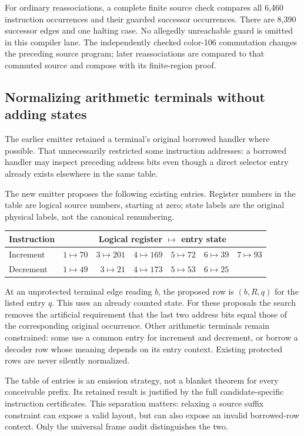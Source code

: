 For ordinary reassociations, a complete finite source check compares all
6,460 instruction occurrences and their guarded successor occurrences.
There are 8,390 successor edges and one halting case.  No allegedly
unreachable guard is omitted in this compiler lane.  The independently
checked color-106 commutation changes the preceding source program; later
reassociations are compared to that commuted source and compose with its
finite-region proof.

\subsection{Normalizing arithmetic terminals without adding states}

The earlier emitter retained a terminal's original borrowed handler where
possible.  That unnecessarily restricted some instruction addresses: a
borrowed handler may inspect preceding address bits even though a direct
selector entry already exists elsewhere in the same table.

The new emitter proposes the following existing entries.  Register numbers
in the table are logical source numbers, starting at zero; state labels
are the original physical labels, not the canonical renumbering.

\begin{center}
\begin{tabular}{@{}lrrrrrr@{}}
\toprule
Instruction & \multicolumn{6}{c}{Logical register $\longmapsto$ entry state}\\
\midrule
Increment & $1\mapsto70$ & $3\mapsto201$ & $4\mapsto169$
 & $5\mapsto72$ & $6\mapsto39$ & $7\mapsto93$\\
Decrement & $1\mapsto49$ & $3\mapsto21$ & $4\mapsto173$
 & $5\mapsto53$ & $6\mapsto25$ & \\
\bottomrule
\end{tabular}
\end{center}

At an unprotected terminal edge reading $b$, the proposed row is
$(b,R,q)$ for the listed entry $q$.  This uses an already counted state.
For these proposals the search removes the artificial requirement that
the last two address bits equal those of the corresponding original
occurrence.  Other arithmetic terminals remain constrained: some use a
common entry for increment and decrement, or borrow a decoder row whose
meaning depends on its entry context.  Existing protected rows are never
silently normalized.

The table of entries is an emission strategy, not a blanket theorem for
every conceivable prefix.  Its retained result is justified by the full
candidate-specific instruction certificates.  This separation matters:
relaxing a source suffix constraint can expose a valid layout, but can also
expose an invalid borrowed-row context.  Only the universal frame audit
distinguishes the two.

